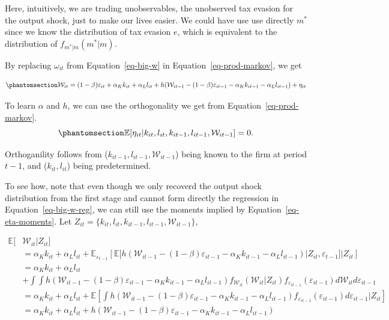 \documentclass[
  12pt]{article}
\theoremstyle{definition}
\theoremstyle{remark}
\begin{document}
Here, intuitively, we are trading unobservables, the unobserved tax
evasion for the output shock, just to make our lives easier. We could
have use use directly \(m^*\) since we know the distribution of tax
evasion \(e\), which is equivalent to the distribution of
\(f_{m^*|m}(m^*|m)\).

By replacing \(\omega_{it}\) from Equation~\ref{eq-big-w} in
Equation~\ref{eq-prod-markov}, we get

\begin{equation}\phantomsection\label{eq-big-w-reg}{
\begin{aligned}
    \mathcal W_{it}=(1-\beta)\varepsilon_{it}+\alpha_K k_{it}+\alpha_L l_{it}+h(\mathcal W_{it-1}-(1-\beta)\varepsilon_{it-1}-\alpha_K k_{it-1}-\alpha_L l_{it-1})+\eta_{it}
\end{aligned}
}\end{equation}

To learn \(\alpha\) and \(h\), we can use the orthogonality we get from
Equation~\ref{eq-prod-markov}.
\begin{equation}\phantomsection\label{eq-eta-moments}{
\mathbb{E}[\eta_{it}|k_{it},l_{it},k_{it-1},l_{it-1},\mathcal{W}_{it-1}]=0.
}\end{equation}

Orthoganility follows from (\(k_{it-1},l_{it-1},\mathcal{W}_{it-1}\))
being known to the firm at period \(t-1\), and (\(k_{it},l_{it}\)) being
predetermined.

To see how, note that even though we only recoverd the output shock
distribution from the first stage and cannot form directly the
regression in Equation~\ref{eq-big-w-reg}, we can still use the moments
implied by Equation~\ref{eq-eta-moments}. Let
\(Z_{it}=\{k_{it},l_{it},k_{it-1},l_{it-1},\mathcal{W}_{it-1}\}\),

\[
\begin{aligned}    
 \mathbb{E}[&\mathcal{W}_{it}|Z_{it}]\\
 &=\alpha_K k_{it}+\alpha_L l_{it}+\mathbb{E}_{\varepsilon_{t-1}}\left[\mathbb{E}[ h(\mathcal W_{it-1}-(1-\beta)\varepsilon_{it-1}-\alpha_K k_{it-1}-\alpha_L l_{it-1})|Z_{it},\varepsilon_{t-1}]|Z_{it}\right]\\
 &=\alpha_K k_{it}+\alpha_L l_{it}\\
 &+\int\int h(\mathcal W_{it-1}-(1-\beta)\varepsilon_{it-1}-\alpha_K k_{it-1}-\alpha_L l_{it-1})f_{\mathcal{W}_{it}}(\mathcal{W}_{it}|Z_{it})f_{\varepsilon_{it-1}}(\varepsilon_{it-1})d\mathcal{W}_{it}d\varepsilon_{it-1}\\
 &=\alpha_K k_{it}+\alpha_L l_{it}+\mathbb{E}\left[\int h(\mathcal W_{it-1}-(1-\beta)\varepsilon_{it-1}-\alpha_K k_{it-1}-\alpha_L l_{it-1})f_{\varepsilon_{it-1}}(\varepsilon_{it-1})d\varepsilon_{it-1}|Z_{it}\right]\\
&=\alpha_K k_{it}+\alpha_L l_{it}+h(\mathcal W_{it-1}-(1-\beta)\varepsilon_{it-1}-\alpha_K k_{it-1}-\alpha_L l_{it-1})
\end{aligned}
\]
\end{document}
